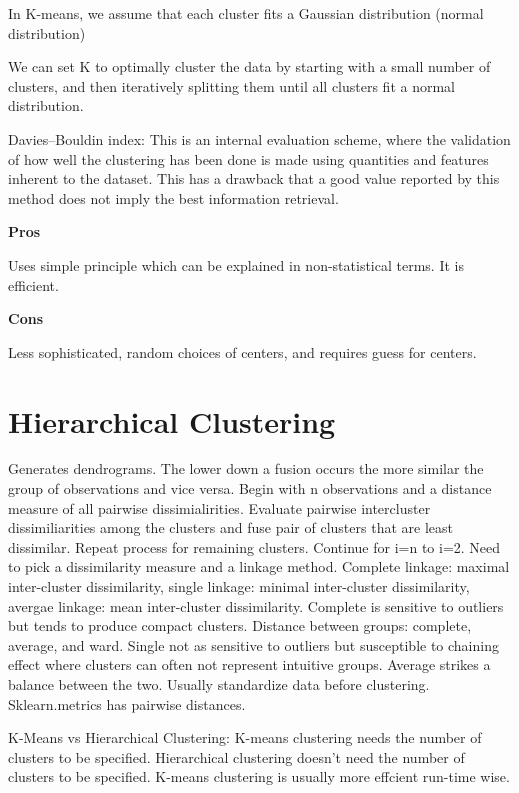 \documentclass[]{book}
\begin{document}
In K-means, we assume that each cluster fits a Gaussian distribution (normal distribution)

We can set K to optimally cluster the data by starting with a small number of clusters, and then iteratively splitting them until all clusters fit a normal distribution.

Davies--Bouldin index: This is an internal evaluation scheme, where the validation of how well the clustering has been done is made using quantities and features inherent to the dataset. This has a drawback that a good value reported by this method does not imply the best information retrieval.

\textbf{Pros}

Uses simple principle which can be explained in non-statistical terms. It is efficient.

\textbf{Cons}

Less sophisticated, random choices of centers, and requires guess for centers.

\hypertarget{hierarchical-clustering}{%
\section{Hierarchical Clustering}\label{hierarchical-clustering}}

Generates dendrograms. The lower down a fusion occurs the more similar the group of observations and vice versa. Begin with n observations and a distance measure of all pairwise dissimialirities. Evaluate pairwise intercluster dissimiliarities among the clusters and fuse pair of clusters that are least dissimilar. Repeat process for remaining clusters. Continue for i=n to i=2.
Need to pick a dissimilarity measure and a linkage method. Complete linkage: maximal inter-cluster dissimilarity, single linkage: minimal inter-cluster dissimilarity, avergae linkage: mean inter-cluster dissimilarity. Complete is sensitive to outliers but tends to produce compact clusters. Distance between groups: complete, average, and ward. Single not as sensitive to outliers but susceptible to chaining effect where clusters can often not represent intuitive groups. Average strikes a balance between the two. Usually standardize data before clustering. Sklearn.metrics has pairwise distances.

K-Means vs Hierarchical Clustering: K-means clustering needs the number of clusters to be speciﬁed. Hierarchical clustering doesn't need the number of clusters to be speciﬁed. K-means clustering is usually more effcient run-time wise.
\end{document}
